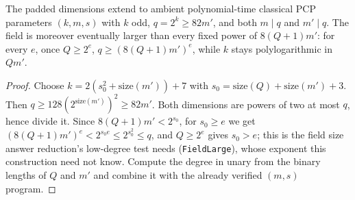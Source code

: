 \begin{lemma}
\label{lem:pcp-effective-parameters}
\leanok
The padded dimensions extend to ambient polynomial-time classical PCP parameters
$(k,m,s)$ with $k$ odd, $q=2^k\geq 82m'$, and both $m\mid q$ and $m'\mid q$. The field is
moreover eventually larger than every fixed power of $8(Q+1)m'$: for every $e$, once
$Q\geq2^e$, $q\geq(8(Q+1)m')^e$, while $k$ stays polylogarithmic in $Qm'$.
\end{lemma}
\begin{proof}
\leanok
Choose $k=2(s_0^2+\mathrm{size}(m'))+7$ with $s_0=\mathrm{size}(Q)+\mathrm{size}(m')+3$. Then
$q\geq128(2^{\mathrm{size}(m')})^2\geq82m'$. Both dimensions are powers of
two at most $q$, hence divide it. Since $8(Q+1)m'<2^{s_0}$, for $s_0\geq e$ we get
$(8(Q+1)m')^e<2^{s_0e}\leq2^{s_0^2}\leq q$, and $Q\geq2^e$ gives $s_0>e$; this is the field
size answer reduction's low-degree test needs (\texttt{FieldLarge}), whose exponent this
construction need not know. Compute the degree in unary from the binary lengths of $Q$ and $m'$
and combine it with the already verified $(m,s)$ program.
\end{proof}

